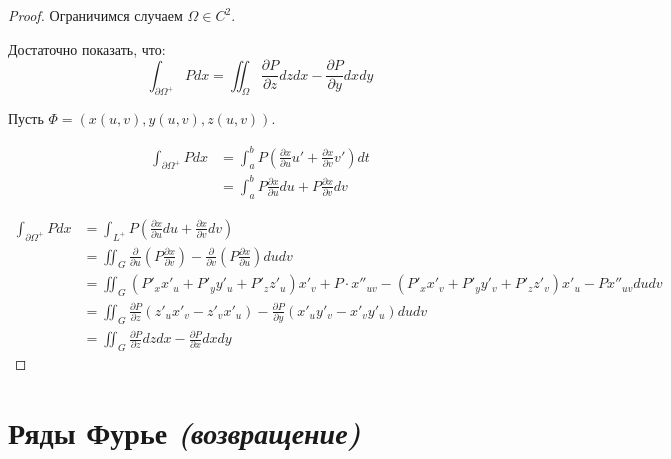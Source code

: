 \begin{proof}
    Ограничимся случаем \(\Omega \in C^2\). %

    Достаточно показать, что:
    \[\int_{\partial \Omega^{ +}} P dx = \iint_\Omega \frac{\partial P}{\partial z} dz dx - \frac{\partial P}{\partial y} dx dy\]

    Пусть \(\Phi = (x(u, v), y(u, v), z(u, v))\).

    \begin{align*}
        \int_{\partial \Omega^{ +}} P dx & =\int_a^b P \left( \frac{\partial x}{\partial u} u' + \frac{\partial x}{\partial v} v' \right) dt \\
                                         & =\int_a^b P \frac{\partial x}{\partial u} du + P \frac{\partial x}{\partial v} dv
    \end{align*}

    \begin{align*}
        \int_{\partial \Omega^{ +}} P dx & = \int_{L^{ +}} P \left( \frac{\partial x}{\partial u} du + \frac{\partial x}{\partial v} dv \right)                                                                    \\
                                         & = \iint_G \frac{\partial}{\partial u} \left( P \frac{\partial x}{\partial v} \right) - \frac{\partial}{\partial v} \left( P \frac{\partial x}{\partial u} \right) du dv \\
                                         & = \iint_G (P'_x x'_u + P'_y y'_u + P'_z z'_u)x'_v + P \cdot x''_{uv} - (P'_x x'_v + P'_y y'_v + P'_z z'_v) x'_u - P x''_{uv} du dv                                      \\
                                         & = \iint_G \frac{\partial P}{\partial z} (z'_u x'_v - z'_v x'_u) - \frac{\partial P}{\partial y} (x'_u y'_v - x'_v y'_u) du dv                                           \\
                                         & = \iint_G \frac{\partial P}{\partial z} dz dx - \frac{\partial P}{\partial x} dx dy
    \end{align*}
\end{proof}

\section{Ряды Фурье \textit{(возвращение)}}

